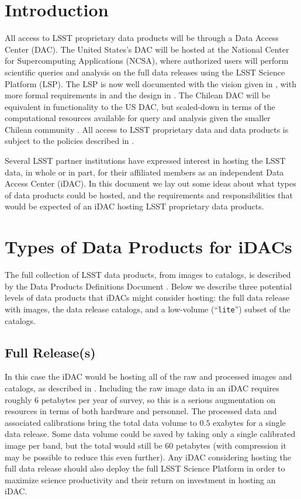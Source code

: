 
\section{Introduction}\label{sec:intro}

All access to LSST proprietary data products will be through a Data Access Center (DAC). The United States's DAC will be hosted at the National Center for Supercomputing Applications (NCSA), where authorized users will perform scientific queries and analysis on the full data releases using the LSST Science Platform (LSP). The LSP is now well documented with the vision given in , with more formal requirements in  and the design in . The Chilean DAC will be equivalent in functionality to the US DAC, but scaled-down in terms of the computational resources available for query and analysis given the smaller Chilean community . All access to LSST proprietary data and data products is subject to the policies described in .

Several LSST partner institutions have expressed interest in hosting the LSST data, in whole or in part, for their affiliated members as an independent Data Access Center (iDAC). In this document we lay out some ideas about what types of data products could be hosted, and the requirements and responsibilities that would be expected of an iDAC hosting LSST proprietary data products.


\section{Types of Data Products for iDACs}\label{sec:data}

The full collection of LSST data products, from images to catalogs, is described by the Data Products Definitions Document . Below we describe three potential levels of data products that iDACs might consider hosting: the full data release with images, the data release catalogs, and a low-volume (``{\tt lite}'') subset of the catalogs.

\subsection{Full Release(s)}

In this case the iDAC would be hosting all of the raw and processed images and catalogs, as described in . Including the raw image data in an iDAC requires roughly $6$ petabytes per year of survey, so this is a serious augmentation on resources in terms of both hardware and personnel. The processed data and associated calibrations bring the total data volume to $0.5$ exabytes for a single data release. Some data volume could be saved by taking only a single calibrated image per band, but the total would still be $60$ petabytes (with compression it may be possible to reduce this even further). Any iDAC considering hosting the full data release should also deploy the full LSST Science Platform  in order to maximize science productivity and their return on investment in hosting an iDAC. 

